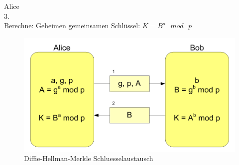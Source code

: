 \documentclass[
  a4paper,
  11pt,
]{article}
\begin{document}
	Alice\\
	3.\\
	Berechne:	Geheimen gemeinsamen Schlüssel: $K=B^a\text{ }mod\text{ }p$\\
	

\begin{figure}[H]
	\centering
	\includegraphics[width=\textwidth]{Diffie-Hellman-Schluesselaustausch2.png}
	\caption{Diffie-Hellman-Merkle Schluesselaustausch}
	\label{img:grafik-dummy}
\end{figure}
\end{document}

